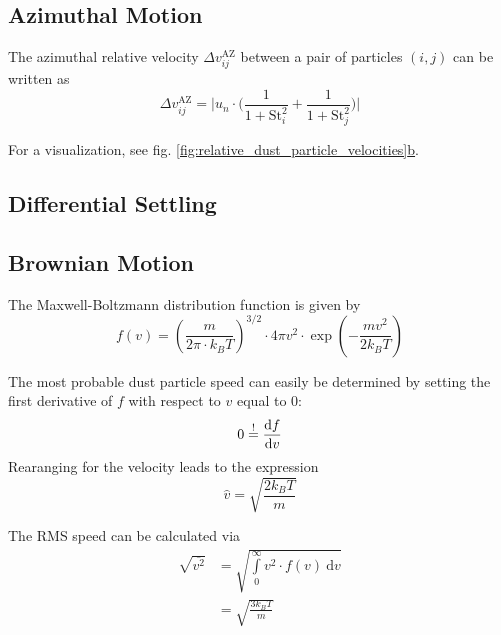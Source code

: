     \subsection{Azimuthal Motion}
 
        The azimuthal relative velocity $\Delta v^\text{AZ}_{ij}$ between a pair 
        of particles $(i, j)$ can be written as
        \begin{equation}
            \Delta v^\text{AZ}_{ij}=\bigg|
                u_n\cdot\bigg(
                    \frac{1}{1+\text{St}_i^2}+
                    \frac{1}{1+\text{St}_j^2}
                \bigg)
            \bigg|
        \end{equation}
    
        For a visualization, see fig. 
        \hyperref[fig:relative_dust_particle_velocities]{\ref*{fig:relative_dust_particle_velocities}b}.

    \subsection{Differential Settling}
    \subsection{Brownian Motion}

      The Maxwell-Boltzmann distribution function is given by 
        \begin{equation}
            f(v)
            =\left(\frac{m}{2\pi\cdot k_BT}\right)^{3/2}
            \cdot4\pi v^2\cdot\exp\left(-\frac{mv^2}{2k_BT}\right)
        \end{equation}

        The most probable dust particle speed can easily be determined by 
        setting the first derivative of $f$ with respect to $v$ equal to 0:
        \begin{equation}
            0\overset{!}{=}\frac{\text{d} f}{\text{d} v}
        \end{equation}
        Rearanging for the velocity leads to the expression
        \begin{equation}
            \hat{v}=\sqrt{\frac{2k_BT}{m}}
        \end{equation}

        The RMS speed can be calculated via
        \begin{align}
            \sqrt{\overline{v^2}}
            &=\sqrt{\int\limits_0^\infty v^2\cdot f(v)\ \text{d}v}\\
            &=\sqrt{\frac{3k_BT}{m}}
        \end{align}

